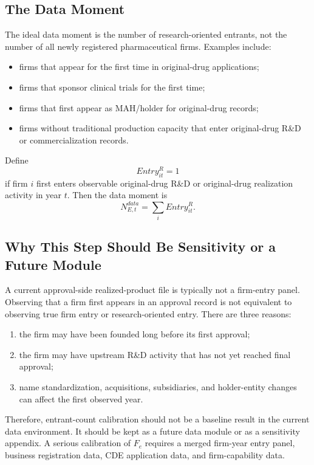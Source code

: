 \documentclass[12pt]{article}
\newcommand{\1}{\mathbf{1}}
\begin{document}
\subsection{The Data Moment}

The ideal data moment is the number of research-oriented entrants, not the number of all newly registered pharmaceutical firms. Examples include:
\begin{itemize}[leftmargin=2em]
    \item firms that appear for the first time in original-drug applications;
    \item firms that sponsor clinical trials for the first time;
    \item firms that first appear as MAH/holder for original-drug records;
    \item firms without traditional production capacity that enter original-drug R\&D or commercialization records.
\end{itemize}

Define
\[
    Entry_{it}^{R}=1
\]
if firm $i$ first enters observable original-drug R\&D or original-drug realization activity in year $t$. Then the data moment is
\[
    N_{E,t}^{data}=\sum_i Entry_{it}^{R}.
\]

\subsection{Why This Step Should Be Sensitivity or a Future Module}

A current approval-side realized-product file is typically not a firm-entry panel. Observing that a firm first appears in an approval record is not equivalent to observing true firm entry or research-oriented entry. There are three reasons:
\begin{enumerate}[leftmargin=2em]
    \item the firm may have been founded long before its first approval;
    \item the firm may have upstream R\&D activity that has not yet reached final approval;
    \item name standardization, acquisitions, subsidiaries, and holder-entity changes can affect the first observed year.
\end{enumerate}

Therefore, entrant-count calibration should not be a baseline result in the current data environment. It should be kept as a future data module or as a sensitivity appendix. A serious calibration of $F_e$ requires a merged firm-year entry panel, business registration data, CDE application data, and firm-capability data.
\end{document}
